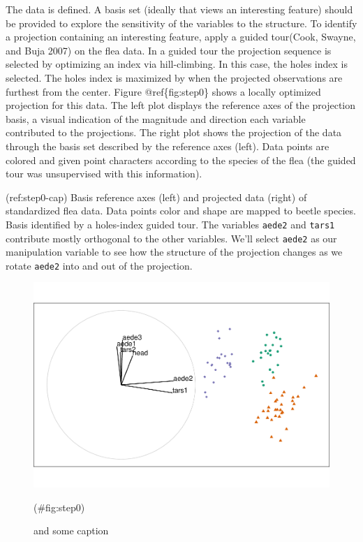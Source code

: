 The data is defined. A basis set (ideally that views an interesting feature) should be provided to explore the sensitivity of the variables to the structure. To identify a projection containing an interesting feature, apply
a guided tour(Cook, Swayne, and Buja 2007) on the flea data. In a guided tour the projection sequence is selected by optimizing an index via hill-climbing. In this case, the holes index is selected. The holes index is maximized by when the projected observations are furthest from the center. Figure @ref\{fig:step0\} shows a locally optimized projection for this data. The left plot displays the reference axes of the projection basis, a visual indication of the magnitude and direction each variable contributed to the projections. The right plot shows the projection of the data through the basis set described by the reference axes (left). Data points are colored and given point characters according to the species of the flea (the guided tour was unsupervised with this information).

(ref:step0-cap) Basis reference axes (left) and projected data (right) of standardized flea data. Data points color and shape are mapped to beetle species. Basis identified by a holes-index guided tour. The variables \texttt{aede2} and \texttt{tars1} contribute mostly orthogonal to the other variables. We'll select \texttt{aede2} as our manipulation variable to see how the structure of the projection changes as we rotate \texttt{aede2} into and out of the projection.

\begin{Schunk}
\begin{figure}

{\centering \includegraphics[width=0.95\linewidth]{spinifex_paper_files/figure-latex/step0-1} 

}

\caption{\label{fig:step0} and some caption}(\#fig:step0)
\end{figure}
\end{Schunk}

